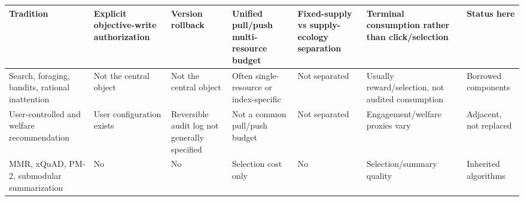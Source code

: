 \documentclass[
  11pt]{article}
\begin{document}
\begin{longtable}[]{@{}
  >{\raggedright\arraybackslash}p{}
  >{\raggedright\arraybackslash}p{}
  >{\raggedright\arraybackslash}p{}
  >{\raggedright\arraybackslash}p{}
  >{\raggedright\arraybackslash}p{}
  >{\raggedright\arraybackslash}p{}
  >{\raggedright\arraybackslash}p{}@{}}
\toprule\noalign{}
\begin{minipage}[b]{\linewidth}\raggedright
Tradition
\end{minipage} & \begin{minipage}[b]{\linewidth}\raggedright
Explicit objective-write authorization
\end{minipage} & \begin{minipage}[b]{\linewidth}\raggedright
Version rollback
\end{minipage} & \begin{minipage}[b]{\linewidth}\raggedright
Unified pull/push multi-resource budget
\end{minipage} & \begin{minipage}[b]{\linewidth}\raggedright
Fixed-supply vs supply-ecology separation
\end{minipage} & \begin{minipage}[b]{\linewidth}\raggedright
Terminal consumption rather than click/selection
\end{minipage} & \begin{minipage}[b]{\linewidth}\raggedright
Status here
\end{minipage} \\
\midrule\noalign{}
\endhead
\bottomrule\noalign{}
\endlastfoot
Search, foraging, bandits, rational inattention & Not the central object
& Not the central object & Often single-resource or index-specific & Not
separated & Usually reward/selection, not audited consumption & Borrowed
components \\
User-controlled and welfare recommendation & User configuration exists &
Reversible audit log not generally specified & Not a common pull/push
budget & Not separated & Engagement/welfare proxies vary & Adjacent, not
replaced \\
MMR, xQuAD, PM-2, submodular summarization & No & No & Selection cost
only & No & Selection/summary quality & Inherited algorithms \\

\end{longtable}
\end{document}

